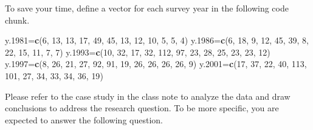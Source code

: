 \documentclass[
]{book}
\newenvironment{Shaded}{\begin{snugshade}}{\end{snugshade}}
\newcommand{\DecValTok}[1]{\textcolor[rgb]{0.00,0.00,0.81}{#1}}
\newcommand{\FloatTok}[1]{\textcolor[rgb]{0.00,0.00,0.81}{#1}}
\newcommand{\FunctionTok}[1]{\textcolor[rgb]{0.13,0.29,0.53}{\textbf{#1}}}
\newcommand{\NormalTok}[1]{#1}
\newcommand{\OtherTok}[1]{\textcolor[rgb]{0.56,0.35,0.01}{#1}}
\begin{document}
To save your time, define a vector for each survey year in the following code chunk.

\begin{Shaded}
\begin{Highlighting}[]
\NormalTok{y}\FloatTok{.1981}\OtherTok{=}\FunctionTok{c}\NormalTok{(}\DecValTok{6}\NormalTok{, }\DecValTok{13}\NormalTok{, }\DecValTok{13}\NormalTok{, }\DecValTok{17}\NormalTok{, }\DecValTok{49}\NormalTok{, }\DecValTok{45}\NormalTok{, }\DecValTok{13}\NormalTok{, }\DecValTok{12}\NormalTok{, }\DecValTok{10}\NormalTok{, }\DecValTok{5}\NormalTok{, }\DecValTok{5}\NormalTok{, }\DecValTok{4}\NormalTok{)}
\NormalTok{y}\FloatTok{.1986}\OtherTok{=}\FunctionTok{c}\NormalTok{(}\DecValTok{6}\NormalTok{, }\DecValTok{18}\NormalTok{, }\DecValTok{9}\NormalTok{, }\DecValTok{12}\NormalTok{, }\DecValTok{45}\NormalTok{, }\DecValTok{39}\NormalTok{, }\DecValTok{8}\NormalTok{, }\DecValTok{22}\NormalTok{, }\DecValTok{15}\NormalTok{, }\DecValTok{11}\NormalTok{, }\DecValTok{7}\NormalTok{, }\DecValTok{7}\NormalTok{)}
\NormalTok{y}\FloatTok{.1993}\OtherTok{=}\FunctionTok{c}\NormalTok{(}\DecValTok{10}\NormalTok{, }\DecValTok{32}\NormalTok{, }\DecValTok{17}\NormalTok{, }\DecValTok{32}\NormalTok{, }\DecValTok{112}\NormalTok{, }\DecValTok{97}\NormalTok{, }\DecValTok{23}\NormalTok{, }\DecValTok{28}\NormalTok{, }\DecValTok{25}\NormalTok{, }\DecValTok{23}\NormalTok{, }\DecValTok{23}\NormalTok{, }\DecValTok{12}\NormalTok{)}
\NormalTok{y}\FloatTok{.1997}\OtherTok{=}\FunctionTok{c}\NormalTok{(}\DecValTok{8}\NormalTok{, }\DecValTok{26}\NormalTok{, }\DecValTok{21}\NormalTok{, }\DecValTok{27}\NormalTok{, }\DecValTok{92}\NormalTok{, }\DecValTok{91}\NormalTok{, }\DecValTok{19}\NormalTok{, }\DecValTok{26}\NormalTok{, }\DecValTok{26}\NormalTok{, }\DecValTok{26}\NormalTok{, }\DecValTok{26}\NormalTok{, }\DecValTok{9}\NormalTok{)}
\NormalTok{y}\FloatTok{.2001}\OtherTok{=}\FunctionTok{c}\NormalTok{(}\DecValTok{17}\NormalTok{, }\DecValTok{37}\NormalTok{, }\DecValTok{22}\NormalTok{, }\DecValTok{40}\NormalTok{, }\DecValTok{113}\NormalTok{, }\DecValTok{101}\NormalTok{, }\DecValTok{27}\NormalTok{, }\DecValTok{34}\NormalTok{, }\DecValTok{33}\NormalTok{, }\DecValTok{34}\NormalTok{, }\DecValTok{36}\NormalTok{, }\DecValTok{19}\NormalTok{)}
\end{Highlighting}
\end{Shaded}

Please refer to the case study in the class note to analyze the data and draw conclusions to address the research question. To be more specific, you are expected to answer the following question.
\end{document}
